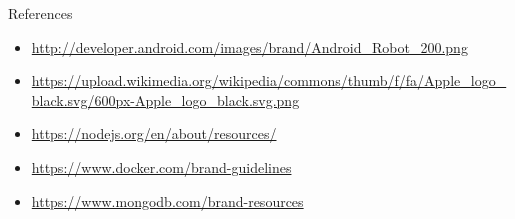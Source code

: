 \documentclass[11pt]{beamer}
\begin{document}
\begin{frame}[allowframebreaks]{References}

	\nocite{*}
	{\tiny }


  {\tiny
    \begin{itemize}
      \item \url{http://developer.android.com/images/brand/Android_Robot_200.png}
      \item \url{https://upload.wikimedia.org/wikipedia/commons/thumb/f/fa/Apple_logo_black.svg/600px-Apple_logo_black.svg.png}
      \item \url{https://nodejs.org/en/about/resources/}
      \item \url{https://www.docker.com/brand-guidelines}
      \item \url{https://www.mongodb.com/brand-resources}
    \end{itemize}
  }
\end{frame}
\end{document}
